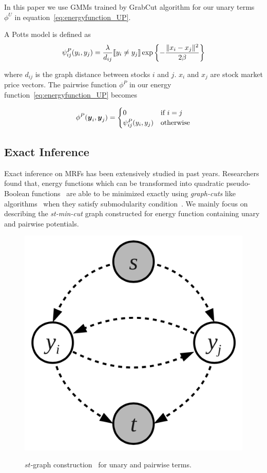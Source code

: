 In this paper we use GMMs trained by GrabCut algorithm for our
unary terms $\phi^U$ in equation~\eqref{eq:energyfunction_UP}.

A Potts model is defined as
\begin{align}
  \label{eq:potts}
  \psi^P_{ij}(y_i, y_j) = \frac{\lambda}{d_{ij}} \ind{y_i \neq
      y_j} \exp\left\{- \frac{\|x_i - x_j\|^2}{2 \beta}\right\}
\end{align}

\noindent where $d_{ij}$ is the graph distance between stocks $i$
and $j$. $x_i$ and $x_j$ are stock market price vectors. The
pairwise function $\phi^P$ in our energy
function~\eqref{eq:energyfunction_UP} becomes

\begin{align}
  \label{eq:energyfunction_pairwise}
  \phi^P(\by_i,\by_j)=
  \begin{cases}
    0 & \text{if } i = j \\
    \psi^P_{ij}(y_i, y_j) &
    \text{otherwise}
  \end{cases}
\end{align}


\subsection{Exact Inference}
\label{sec:exact_inference}

Exact inference on MRFs has been extensively studied in past
years. Researchers found that, energy functions which can be
transformed into quadratic pseudo-Boolean
functions~\cite{Ishikawa:PAMI03,Ishikawa:CVPR09,Rother:CVPR09}
are able to be minimized exactly using \emph{graph-cuts} like
algorithms~\cite{Freedman:CVPR05,Hammer:1965} when they satisfy
submodularity condition~\cite{Boros:MATH02}. We mainly focus on
describing the \emph{st-min-cut} graph constructed for energy
function containing unary and pairwise potentials.

\begin{figure}[t]
  \centering
    \includegraphics[width=0.5\columnwidth]{Methodology/figures/unary_pairwise.png}\\
  \caption{\label{fig:stmincut} $st$-graph
    construction~\cite{gouldlearning} for unary and pairwise
    terms.}
\end{figure}

